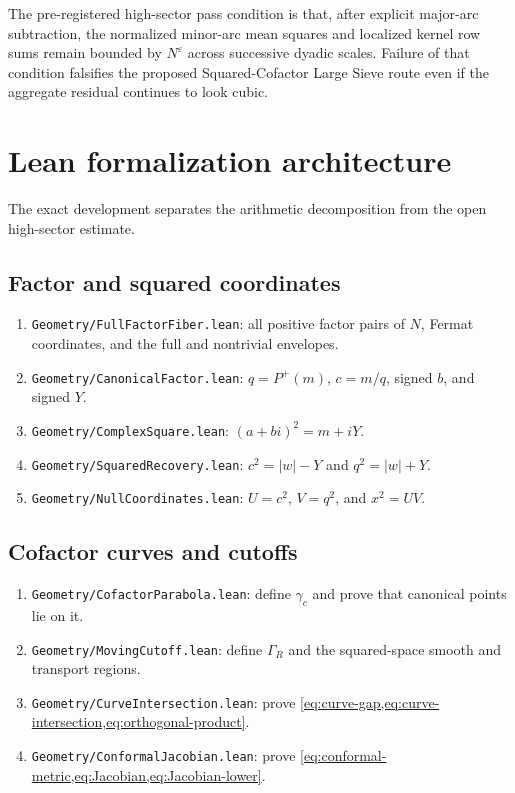 \documentclass[11pt]{article}
\theoremstyle{definition}
\theoremstyle{remark}
\newcommand{\eps}{\varepsilon}
\newcommand{\Pplus}{P^{+}}
\newcommand{\1}{\mathbf{1}}
\begin{document}
The pre-registered high-sector pass condition is that, after explicit
major-arc subtraction, the normalized minor-arc mean squares and
localized kernel row sums remain bounded by $N^\eps$ across successive
dyadic scales.  Failure of that condition falsifies the proposed
Squared-Cofactor Large Sieve route even if the aggregate residual
continues to look cubic.


\section{Lean formalization architecture}
\label{sec:lean}

The exact development separates the arithmetic decomposition from the open high-sector estimate.

\subsection{Factor and squared coordinates}

\begin{enumerate}[leftmargin=1.7em,itemsep=0.3em]
\item \texttt{Geometry/FullFactorFiber.lean}: all positive factor pairs of $N$, Fermat coordinates, and the full and nontrivial envelopes.
\item \texttt{Geometry/CanonicalFactor.lean}: $q=\Pplus(m)$, $c=m/q$, signed $b$, and signed $Y$.
\item \texttt{Geometry/ComplexSquare.lean}: $(a+bi)^2=m+iY$.
\item \texttt{Geometry/SquaredRecovery.lean}: $c^2=|w|-Y$ and $q^2=|w|+Y$.
\item \texttt{Geometry/NullCoordinates.lean}: $U=c^2$, $V=q^2$, and $x^2=UV$.
\end{enumerate}

\subsection{Cofactor curves and cutoffs}

\begin{enumerate}[leftmargin=1.7em,itemsep=0.3em]
\item \texttt{Geometry/CofactorParabola.lean}: define $\gamma_c$ and prove that canonical points lie on it.
\item \texttt{Geometry/MovingCutoff.lean}: define $\Gamma_R$ and the squared-space smooth and transport regions.
\item \texttt{Geometry/CurveIntersection.lean}: prove \cref{eq:curve-gap,eq:curve-intersection,eq:orthogonal-product}.
\item \texttt{Geometry/ConformalJacobian.lean}: prove \cref{eq:conformal-metric,eq:Jacobian,eq:Jacobian-lower}.
\end{enumerate}
\end{document}
